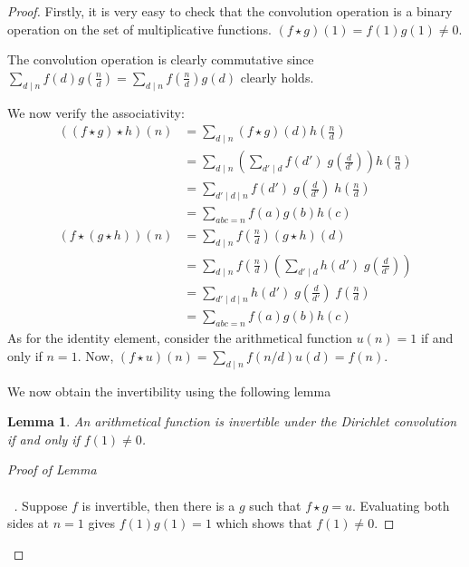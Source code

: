 \documentclass[10pt,openany]{book}
\theoremstyle{italicnonumber}
\newtheorem*{slemma}{Lemma}
\newenvironment{prooflem}[1][]{
  \renewcommand{\qedsymbol}{\ensuremath{\backslash\backslash\backslash}}
  \begin{proof}[Proof of Lemma\ifx\\#1\\\else~#1\fi]
}{
  \end{proof}
  \renewcommand{\qedsymbol}{\oldqedsymbol}%
}
\theoremstyle{definition}
\renewcommand\qedsymbol{$\blacksquare$}
\begin{document}
\begin{proof}
  Firstly, it is very easy to check that the convolution operation is a binary operation on the set of multiplicative functions. $(f\star g)(1) = f(1)g(1) \neq 0$.

  The convolution operation is clearly commutative since $\sum_{d\mid n} f(d) g\left(\frac{n}{d}\right) = \sum_{d\mid n} f\left(\frac{n}{d}\right) g(d)$ clearly holds.

  We now verify the associativity:
  \[
  \begin{aligned}
  ((f\star g)\star h)(n) & = \sum_{d \mid n} (f \star g)(d) h\left(\frac{n}{d}\right) \\
  & = \sum_{d \mid n} \left( \sum_{d' \mid d} f(d') \; g\left( \frac{d}{d'} \right) \right) h\left(\frac{n}{d}\right) \\
  & = \sum_{d' \mid d \mid n} f(d') \; g\left( \frac{d}{d'} \right) \; h\left(\frac{n}{d}\right) \\
  & = \sum_{abc=n} f(a)g(b)h(c)
  \end{aligned}
  \]
  \[
  \begin{aligned}
  (f\star (g\star h))(n) & = \sum_{d \mid n} f\left( \frac{n}{d} \right) (g\star h)(d)  \\
  & = \sum_{d \mid n} f\left( \frac{n}{d} \right) \left( \sum_{d' \mid d} h(d') \; g\left( \frac{d}{d'} \right) \right) \\
  & = \sum_{d' \mid d \mid n} h(d') \; g\left( \frac{d}{d'} \right) \; f\left(\frac{n}{d}\right) \\
  & = \sum_{abc=n} f(a)g(b)h(c)
  \end{aligned}
  \]
  As for the identity element, consider the arithmetical function $u(n) = 1$ if and only if $n=1$. Now, $(f \star u)(n) = \sum_{d \mid n} f(n/d) u(d) = f(n)$.

  We now obtain the invertibility using the following lemma

  \begin{slemma}
  An arithmetical function is invertible under the Dirichlet convolution if and only if $f(1) \neq 0$.
  \end{slemma}

  \begin{prooflem}
  Suppose $f$ is invertible, then there is a $g$ such that $f \star g = u$. Evaluating both sides at $n=1$ gives $f(1)g(1)=1$ which shows that $f(1)\neq 0$.


\end{prooflem}
\end{proof}
\end{document}
